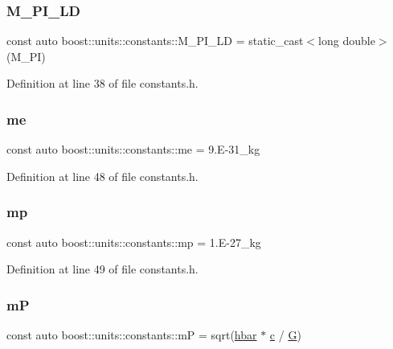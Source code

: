 \subsubsection{\texorpdfstring{M\+\_\+\+P\+I\+\_\+\+LD}{M\_PI\_LD}}
{\footnotesize\ttfamily const auto boost\+::units\+::constants\+::\+M\+\_\+\+P\+I\+\_\+\+LD = static\+\_\+cast$<$long double$>$(M\+\_\+\+PI)}



Definition at line 38 of file constants.\+h.

\hypertarget{namespaceboost_1_1units_1_1constants_ae2a04958a1975830e160ad479847dc3c}{}\label{namespaceboost_1_1units_1_1constants_ae2a04958a1975830e160ad479847dc3c} 
\subsubsection{\texorpdfstring{me}{me}}
{\footnotesize\ttfamily const auto boost\+::units\+::constants\+::me = 9.\+E-\/31\+\_\+kg}



Definition at line 48 of file constants.\+h.

\hypertarget{namespaceboost_1_1units_1_1constants_a6982d40da35988ea3b2504020384bcf2}{}\label{namespaceboost_1_1units_1_1constants_a6982d40da35988ea3b2504020384bcf2} 
\subsubsection{\texorpdfstring{mp}{mp}}
{\footnotesize\ttfamily const auto boost\+::units\+::constants\+::mp = 1.\+E-\/27\+\_\+kg}



Definition at line 49 of file constants.\+h.

\hypertarget{namespaceboost_1_1units_1_1constants_a0f6fdb4e97cf36ba41c8564d2bb3d641}{}\label{namespaceboost_1_1units_1_1constants_a0f6fdb4e97cf36ba41c8564d2bb3d641} 
\subsubsection{\texorpdfstring{mP}{mP}}
{\footnotesize\ttfamily const auto boost\+::units\+::constants\+::mP = sqrt(\hyperlink{namespaceboost_1_1units_1_1constants_a0203c96d139e639b8ee536cbc010c7bd}{hbar} $\ast$ \hyperlink{namespaceboost_1_1units_1_1constants_a1e4c07de84b2d43e7717eaada50b32de}{c} / \hyperlink{namespaceboost_1_1units_1_1constants_abeab95597a02e0f0bccbd005fd8cb968}{G})}



